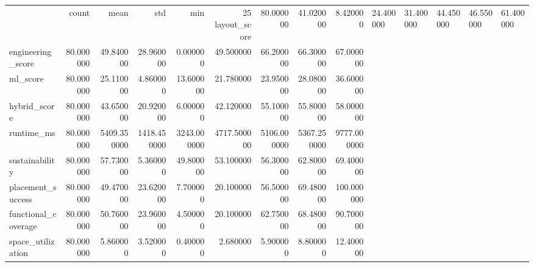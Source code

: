 \begin{tabular}{lrrrrrrrr}
 & count & mean & std & min & 25%
layout_score & 80.000000 & 41.020000 & 8.420000 & 24.400000 & 31.400000 & 44.450000 & 46.550000 & 61.400000 \\
engineering_score & 80.000000 & 49.840000 & 28.960000 & 0.000000 & 49.500000 & 66.200000 & 66.300000 & 67.000000 \\
ml_score & 80.000000 & 25.110000 & 4.860000 & 13.600000 & 21.780000 & 23.950000 & 28.080000 & 36.600000 \\
hybrid_score & 80.000000 & 43.650000 & 20.920000 & 6.000000 & 42.120000 & 55.100000 & 55.800000 & 58.000000 \\
runtime_ms & 80.000000 & 5409.350000 & 1418.450000 & 3243.000000 & 4717.500000 & 5106.000000 & 5367.250000 & 9777.000000 \\
sustainability & 80.000000 & 57.730000 & 5.360000 & 49.800000 & 53.100000 & 56.300000 & 62.800000 & 69.400000 \\
placement_success & 80.000000 & 49.470000 & 23.620000 & 7.700000 & 20.100000 & 56.500000 & 69.480000 & 100.000000 \\
functional_coverage & 80.000000 & 50.760000 & 23.960000 & 4.500000 & 20.100000 & 62.750000 & 68.480000 & 90.700000 \\
space_utilization & 80.000000 & 5.860000 & 3.520000 & 0.400000 & 2.680000 & 5.900000 & 8.800000 & 12.400000 \\
\end{tabular}
